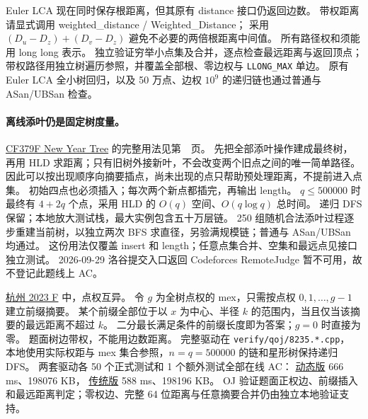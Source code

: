 Euler LCA 现在同时保存根距离，但其原有 distance 接口仍返回边数。
带权距离请显式调用 weighted\_distance / Weighted\_Distance；
采用 $(D_u-D_z)+(D_v-D_z)$ 避免不必要的两倍根距离中间值。
所有路径权和须能用 long long 表示。
独立验证穷举小点集及合并，逐点检查最远距离与返回顶点；
带权路径用独立树遍历参照，并覆盖全部根、零边权与 \texttt{LLONG\_MAX} 单边。
原有 Euler LCA 全小树回归，以及 50 万点、边权 $10^9$ 的递归链也通过普通与 ASan/UBSan 检查。

\paragraph{离线添叶仍是固定树度量。}
\href{https://codeforces.com/problemset/problem/379/F}{CF379F New Year Tree} 的完整用法见第~\pageref{usage-example-170}~页。
先把全部添叶操作建成最终树，再用 HLD 求距离；只有旧树外接新叶，不会改变两个旧点之间的唯一简单路径。
因此可以按出现顺序向摘要插点，尚未出现的点只帮助预处理距离，不提前进入点集。
初始四点也必须插入；每次两个新点都插完，再输出 length。
$q\le500000$ 时最终有 $4+2q$ 个点，采用 HLD 的 $O(q)$ 空间、$O(q\log q)$ 总时间。
递归 DFS 保留；本地放大测试栈，最大实例包含五十万层链。
250 组随机合法添叶过程逐步重建当前树，以独立两次 BFS 求直径，另验满规模链；普通与 ASan/UBSan 均通过。
这份用法仅覆盖 insert 和 length；任意点集合并、空集和最远点见接口独立测试。
2026-09-29 洛谷提交入口返回 Codeforces RemoteJudge 暂不可用，故不登记此题线上 AC。

\href{https://qoj.ac/problem/8235}{杭州 2023 F} 中，点权互异。
令 $g$ 为全树点权的 mex，只需按点权 $0,1,\ldots,g-1$ 建立前缀摘要。
某个前缀全部位于以 $x$ 为中心、半径 $k$ 的范围内，当且仅当该摘要的最远距离不超过 $k$。
二分最长满足条件的前缀长度即为答案；$g=0$ 时直接为零。
题面树边带权，不能用边数距离。
完整驱动在 \texttt{verify/qoj/8235.*.cpp}，
本地使用实际权距与 mex 集合参照，$n=q=500000$ 的链和星形树保持递归 DFS。
两套驱动各 50 个正式测试和 1 个额外测试全部在线 AC：
\href{https://qoj.ac/submission/2939493}{动态版} 666 ms、198076 KB，
\href{https://qoj.ac/submission/2939551}{传统版} 588 ms、198196 KB。
OJ 验证题面正权边、前缀插入和最远距离判定；零权边、完整 64 位距离与任意摘要合并仍由独立本地验证支持。

\clearpage
